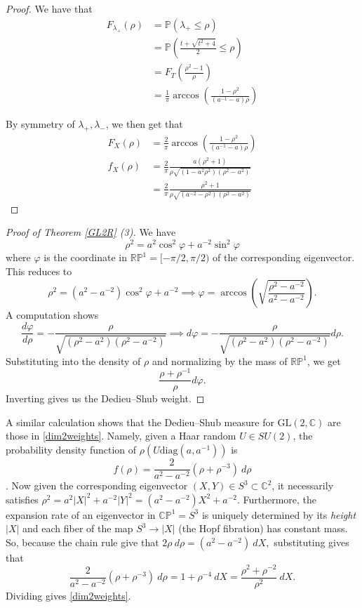 \documentclass[10pt]{amsart}
\numberwithin{equation}{section}     %
\newcommand{\C}{\mathbb{C}}
\renewcommand{\P}{\mathbb{P}}
\newcommand{\CP}{\mathbb{CP}}
\newcommand{\RP}{\mathbb{RP}}
\newcommand{\GL}{\mathrm{GL}}
\begin{document}
\begin{proof}
    We have that
    \begin{align*}
        F_{\lambda_+}(\rho) &= \P(\lambda_+ \leq \rho) \\
        &= \P\left( \frac{t + \sqrt{t^2 + 4}}{2} \leq \rho \right) \\
        &= F_T \left( \frac{\rho^2 - 1}{\rho}\right) \\
        &= \frac{1}{\pi} \arccos\left(\frac{1-\rho^2}{(a^{-1} - a)\rho}\right)
    \end{align*}

    By symmetry of $\lambda_+, \lambda_-$, we then get that \begin{align*}
        F_X(\rho) &= \frac{2}{\pi} \arccos \left( \frac{1-\rho^2}{(a^{-1} - a)\rho}\right) \\ 
        f_X(\rho) &= \frac{2}{\pi} \frac{a(\rho^2 + 1)}{\rho\sqrt{(1-a^2\rho^2)(\rho^2-a^2)}} \\ 
        &= \frac{2}{\pi} \frac{\rho^2 + 1}{\rho\sqrt{(a^{-2}-\rho^2)(\rho^2-a^2)}}
    \end{align*} 
\end{proof}



\begin{proof}[Proof of Theorem \ref{GL2R} (3)]
    We have $$\rho^2 = a^2 \cos^2 \varphi + a^{-2} \sin^2 \varphi$$ where $\varphi$ is the coordinate in $\RP^1 = [-\pi/2,\pi/2)$ of the corresponding eigenvector. This reduces to $$\rho^2 = (a^2 - a^{-2})\cos^2\varphi + a^{-2} \implies \varphi = \arccos\left( \sqrt{\frac{\rho^2-a^{-2}}{a^2 - a^{-2}}}\right).$$
    A computation shows $$\frac{d\varphi}{d\rho} =-\frac{\rho}{\sqrt{( \rho^2-a^2)(\rho^2 - a^{-2})}} \implies d\varphi = -\frac{\rho}{\sqrt{( \rho^2-a^2)(\rho^2 - a^{-2})}} d\rho.$$
    Substituting into the density of $\rho$ and normalizing by the mass of $\RP^1$, we get $$\frac{\rho + \rho^{-1}}{\rho} d\varphi. $$
    Inverting gives us the Dedieu--Shub weight. 
\end{proof}

A similar calculation shows that the Dedieu--Shub measure for $\GL(2,\C)$ are those in \ref{dim2weights}. Namely, given a Haar random $U \in SU(2)$, the probability density function of $\rho(U\mathrm{diag}(a,a^{-1}))$ is $$f(\rho) = \frac{2}{a^2 - a^{-2}}(\rho + \rho^{-3}) \ d\rho$$. Now given the corresponding eigenvector $(X,Y) \in S^3 \subset \C^2$, it necessarily satisfies $\rho^2 = a^2|X|^2 + a^{-2}|Y|^2 = (a^2 - a^{-2})X^2 + a^{-2}$. Furthermore, the expansion rate of an eigenvector in $\CP^1 = S^3$ is uniquely determined by its \emph{height} $|X|$ and each fiber of the map $S^3 \to |X|$ (the Hopf fibration) has constant mass. So, because the chain rule give that $2\rho \ d\rho = (a^2 - a^{-2}) \ dX,$  substituting gives that \begin{equation}
    \frac{2}{a^2 - a^{-2}}(\rho + \rho^{-3}) \ d\rho = 1 + \rho^{-4} \ dX = \frac{\rho^2 + \rho^{-2}}{\rho^2} \ dX.
\end{equation} Dividing gives \ref{dim2weights}.
\end{document}
